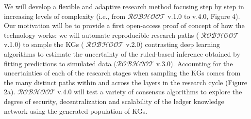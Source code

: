 \documentclass[12pt, a4paper]{article} %
\begin{document}
We will develop a flexible and adaptive research method focusing step
by step in increasing levels of complexity (i.e., from {\bf
  $\mathcal{ROBHOOT}$} v.1.0 to v.4.0, Figure 4). Our motivation will
be to provide a first open-access proof of concept of how the
technology works: we will automate reproducible research paths ({\bf
  $\mathcal{ROBHOOT}$} v.1.0) to sample the KGs ({\bf
  $\mathcal{ROBHOOT}$} v.2.0) contrasting deep learning algorithms to
estimate the uncertainty of the ruled-based inference obtained by
fitting predictions to simulated data ({\bf $\mathcal{ROBHOOT}$}
v.3.0). Accounting for the uncertainties of each of the research
stages when sampling the KGs comes from the many distinct paths within
and across the layers in the research cycle (Figure 2a). {\bf
  $\mathcal{ROBHOOT}$} v.4.0 will test a variety of consensus
algorithms to explore the degree of security, decentralization and
scalability of the ledger knowledge network using the generated
population of KGs.
\end{document}
